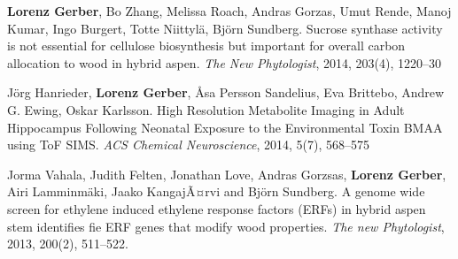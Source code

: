 \documentclass[10pt]{article}
\begin{document}
\begin{bibenum}
                                                                                           \item \textbf{Lorenz Gerber}, Bo Zhang, Melissa Roach,
                                                                                             Andras Gorzas, Umut Rende, Manoj Kumar, Ingo Burgert,
                                                                                             Totte Niittyl\"{a}, Bj\"{o}rn Sundberg. Sucrose synthase
                                                                                             activity is not essential for cellulose biosynthesis but important
                                                                                             for overall carbon allocation to wood in hybrid aspen.
                                                                                             \textit{The New Phytologist}, 2014, 203(4), 1220--30\\

                                                                                           \item J\"{o}rg Hanrieder, \textbf{Lorenz Gerber}, \AA sa Persson
                                                                                             Sandelius,  Eva Brittebo, Andrew G. Ewing, Oskar Karlsson.
                                                                                             High Resolution Metabolite Imaging in Adult Hippocampus
                                                                                             Following Neonatal Exposure to the Environmental Toxin BMAA
                                                                                             using ToF SIMS. \textit{ACS Chemical Neuroscience}, 2014,
                                                                                             5(7), 568--575\\

                                                                                           \item Jorma Vahala, Judith Felten, Jonathan Love, Andras Gorzsas,
                                                                                             \textbf{Lorenz Gerber}, Airi Lamminm\"{a}ki, Jaako KangajÃ¤rvi and Bj\"{o}rn
                                                                                             Sundberg.
                                                                                             A genome wide screen for ethylene induced ethylene response factors (ERFs) in hybrid aspen
                                                                                             stem identifies fie ERF genes that modify wood properties.
                                                                                             \textit{The new Phytologist}, 2013, 200(2), 511--522.\\



\end{bibenum}
\end{document}
